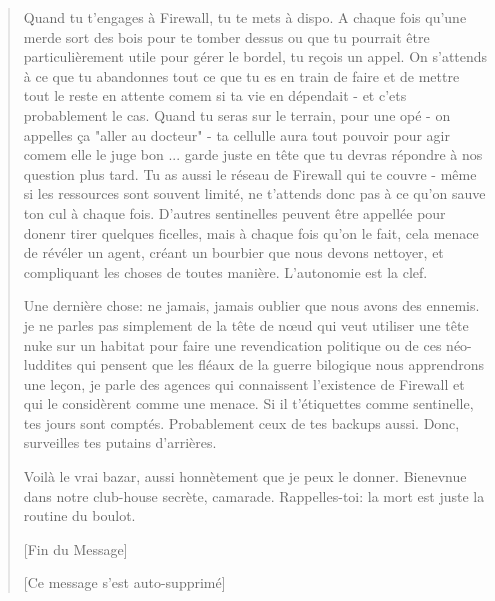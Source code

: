 \begin{quotation}
Quand tu t'engages à Firewall, tu te mets à dispo. A chaque fois qu'une merde sort des bois pour te tomber dessus ou que tu pourrait être particulièrement utile pour gérer le bordel, tu reçois un appel. On s'attends à ce que tu abandonnes tout ce que tu es en train de faire et de mettre tout le reste en attente comem si ta vie en dépendait - et c'ets probablement le cas. Quand tu seras sur le terrain, pour une opé - on appelles ça "aller au docteur" - ta cellulle aura tout pouvoir pour agir comem elle le juge bon ... garde juste en tête que tu devras répondre à nos question plus tard. Tu as aussi le réseau de Firewall qui te couvre - même si les ressources sont souvent limité, ne t'attends donc pas à ce qu'on sauve ton cul à chaque fois. D'autres sentinelles peuvent être appellée pour donenr tirer quelques ficelles, mais à chaque fois qu'on le fait, cela menace de révéler un agent, créant un bourbier que nous devons nettoyer, et compliquant les choses de toutes manière. L'autonomie est la clef. 

Une dernière chose: ne jamais, jamais oublier que nous avons des ennemis. je ne parles pas simplement de la tête de nœud qui veut utiliser une tête nuke sur un habitat pour faire une revendication politique ou de ces néo-luddites qui pensent que les fléaux de la guerre bilogique nous apprendrons une leçon, je parle des agences qui connaissent l'existence de Firewall et qui le considèrent comme une menace. Si il t'étiquettes comme sentinelle, tes jours sont comptés. Probablement ceux de tes backups aussi. Donc, surveilles tes putains d'arrières. 

Voilà le vrai bazar, aussi honnètement que je peux le donner. Bienevnue dans notre club-house secrète, camarade. Rappelles-toi: la mort est juste la routine du boulot. 

[Fin du Message] 

[Ce message s'est auto-supprimé] \end{quotation} 



